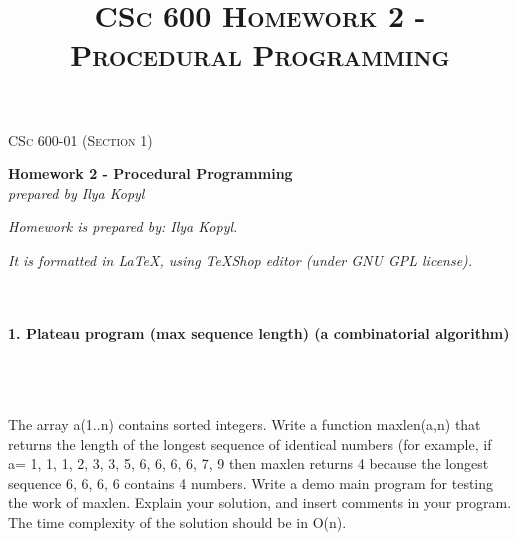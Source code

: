 \documentclass{article}
\begin{document}
	\setlength{\grammarparsep}{5pt plus 1pt minus 1pt} %
	\setlength{\grammarindent}{13em} %




	\begin{titlepage}
		\begin{center}
				\Large\textsc{CSc 600-01 (Section 1)}
				
				\Large\textbf{Homework 2 - Procedural Programming}\\

				\Large\textit{prepared by Ilya Kopyl}
				
		\end{center}	
	\end{titlepage}


	\title{\textsc{CSc 600 Homework 2 - Procedural Programming}}	
	\maketitle
	
		\textit{Homework is prepared by: Ilya Kopyl.}

		\textit{It is formatted in LaTeX, using TeXShop editor (under GNU GPL license).}
		


	\rmfamily\




	\paragraph{1. Plateau program (max sequence length) (a combinatorial algorithm)}\
	\rmfamily\\\
	
		The array a(1..n) contains sorted integers. Write a function maxlen(a,n) that returns the length of the longest sequence of identical numbers (for example, if a={ 1, 1, 1, 2, 3, 3, 5, 6, 6, 6, 6, 7, 9 } then maxlen returns 4 because the longest sequence 6, 6, 6, 6 contains 4 numbers. Write a demo main program for testing the work of maxlen. Explain your solution, and insert comments in your program. The time complexity of the solution should be in O(n).
		\newline
		
\end{document}
